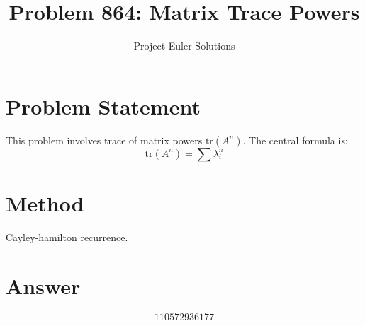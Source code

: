 \documentclass[11pt]{article}
\title{Problem 864: Matrix Trace Powers}
\author{Project Euler Solutions}
\date{}
\begin{document}
\maketitle
\section{Problem Statement}
This problem involves trace of matrix powers $\text{tr}(A^n)$. The central formula is:
\[
\text{tr}(A^n) = \sum \lambda_i^n
\]
\section{Method}
Cayley-hamilton recurrence.
\section{Answer}

\[
\boxed{110572936177}
\]
\end{document}
